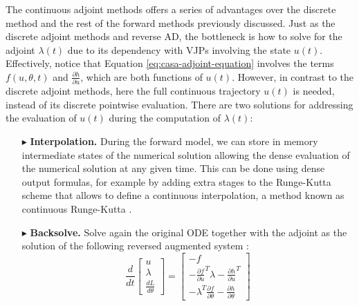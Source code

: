 The continuous adjoint methods offers a series of advantages over the discrete method and the rest of the forward methods previously discussed. 
Just as the discrete adjoint methods and reverse AD, the bottleneck is how to solve for the adjoint $\lambda(t)$ due to its dependency with VJPs involving the state $u(t)$.
Effectively, notice that Equation \eqref{eq:casa-adjoint-equation} involves the terms $f(u, \theta, t)$ and $\frac{\partial h}{\partial u}$, which are both functions of $u(t)$. 
However, in contrast to the discrete adjoint methods, here the full continuous trajectory $u(t)$ is needed, instead of its discrete pointwise evaluation. 
There are two solutions for addressing the evaluation of $u(t)$ during the computation of $\lambda (t)$:
\begin{enumerate}
    \item[$ \blacktriangleright$] \textbf{Interpolation.} During the forward model, we can store in memory intermediate states of the numerical solution allowing the dense evaluation of the numerical solution at any given time. 
    This can be done using dense output formulas, for example by adding extra stages to the Runge-Kutta scheme that allows to define a continuous interpolation, a method known as continuous Runge-Kutta \cite{hairer-solving-2, Alexe_Sandu_2009}. 
    \item[$ \blacktriangleright$] \textbf{Backsolve.} Solve again the original ODE together with the adjoint as the solution of the following reversed augmented system \cite{chen_neural_2019}:
    \begin{equation}
    \frac{d}{dt}
    \begin{bmatrix}
       u \\
       \lambda \\
       \frac{dL}{d\theta}
    \end{bmatrix}
    = 
    \begin{bmatrix}
       -f \\
       - \frac{\partial f}{\partial u}^T \lambda - \frac{\partial h}{\partial u}^T \\
       - \lambda^T \frac{\partial f}{\partial \theta} - \frac{\partial h}{\partial \theta}

\end{bmatrix}
\end{equation}
\end{enumerate}
